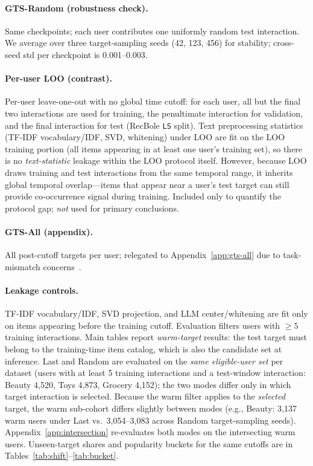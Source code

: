 \documentclass[sigconf,natbib=true,anonymous]{acmart}
\newcommand{\tfidf}{\textsc{TF-IDF}\xspace}
\begin{document}
\paragraph{GTS-Random (robustness check).}
Same checkpoints; each user contributes one uniformly random test interaction.  We average over three target-sampling seeds (42, 123, 456) for stability; cross-seed std per checkpoint is 0.001--0.003.

\paragraph{Per-user LOO (contrast).}
Per-user leave-one-out with no global time cutoff: for each user, all but the final two interactions are used for training, the penultimate interaction for validation, and the final interaction for test (RecBole \texttt{LS} split).
Text preprocessing statistics (\tfidf vocabulary/IDF, SVD, whitening) under LOO are fit on the LOO training portion (all items appearing in at least one user's training set), so there is no \emph{text-statistic} leakage within the LOO protocol itself.
However, because LOO draws training and test interactions from the same temporal range, it inherits global temporal overlap---items that appear near a user's test target can still provide co-occurrence signal during training.
Included only to quantify the protocol gap; \emph{not} used for primary conclusions.

\paragraph{GTS-All (appendix).}
All post-cutoff targets per user; relegated to Appendix~\ref{app:gts-all} due to task-mismatch concerns~\cite{gusak2025time}.

\paragraph{Leakage controls.}
\tfidf vocabulary/IDF, SVD projection, and LLM center/whitening are fit only on items appearing before the training cutoff.
Evaluation filters users with $\ge 5$ training interactions.
Main tables report \emph{warm-target} results: the test target must belong to the training-time item catalog, which is also the candidate set at inference.
Last and Random are evaluated on the \emph{same eligible-user set} per dataset (users with at least 5 training interactions and a test-window interaction: Beauty 4{,}520, Toys 4{,}873, Grocery 4{,}152); the two modes differ only in which target interaction is selected.
Because the warm filter applies to the \emph{selected} target, the warm sub-cohort differs slightly between modes (e.g., Beauty: 3{,}137 warm users under Last vs.\ 3{,}054--3{,}083 across Random target-sampling seeds).
Appendix~\ref{app:intersection} re-evaluates both modes on the intersecting warm users.
Unseen-target shares and popularity buckets for the same cutoffs are in Tables~\ref{tab:shift}--\ref{tab:bucket}.
\end{document}

